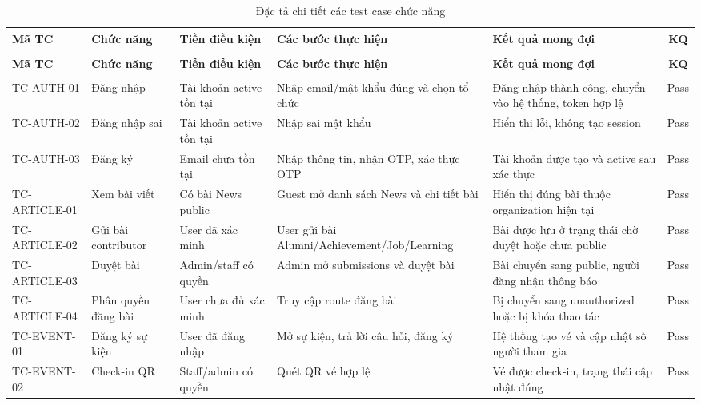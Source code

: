\documentclass[12pt,a4paper,oneside]{report}
\begin{document}
\renewcommand{\arraystretch}{1.25}
{\small
\begin{longtable}{|>{\raggedright\arraybackslash}p{2.3cm}|>{\raggedright\arraybackslash}p{2.1cm}|>{\raggedright\arraybackslash}p{2.6cm}|>{\raggedright\arraybackslash}p{3.4cm}|>{\raggedright\arraybackslash}p{3.6cm}|c|}
\caption{Đặc tả chi tiết các test case chức năng}\label{tab:appendixB}\\
\hline \textbf{Mã TC} & \textbf{Chức năng} & \textbf{Tiền điều kiện} & \textbf{Các bước thực hiện} & \textbf{Kết quả mong đợi} & \textbf{KQ} \\ \hline
\endfirsthead
\multicolumn{6}{l}{\itshape\small Bảng B.1 (tiếp theo)}\\[2pt]
\hline \textbf{Mã TC} & \textbf{Chức năng} & \textbf{Tiền điều kiện} & \textbf{Các bước thực hiện} & \textbf{Kết quả mong đợi} & \textbf{KQ} \\ \hline
\endhead
\hline \multicolumn{6}{r}{\itshape\small (còn tiếp)}\\
\endfoot
\hline
\endlastfoot
TC-AUTH-01 & Đăng nhập & Tài khoản active tồn tại & Nhập email/mật khẩu đúng và chọn tổ chức & Đăng nhập thành công, chuyển vào hệ thống, token hợp lệ & Pass \\ \hline
TC-AUTH-02 & Đăng nhập sai & Tài khoản active tồn tại & Nhập sai mật khẩu & Hiển thị lỗi, không tạo session & Pass \\ \hline
TC-AUTH-03 & Đăng ký & Email chưa tồn tại & Nhập thông tin, nhận OTP, xác thực OTP & Tài khoản được tạo và active sau xác thực & Pass \\ \hline
TC-ARTICLE-01 & Xem bài viết & Có bài News public & Guest mở danh sách News và chi tiết bài & Hiển thị đúng bài thuộc organization hiện tại & Pass \\ \hline
TC-ARTICLE-02 & Gửi bài contributor & User đã xác minh & User gửi bài Alumni/Achievement/Job/Learning & Bài được lưu ở trạng thái chờ duyệt hoặc chưa public & Pass \\ \hline
TC-ARTICLE-03 & Duyệt bài & Admin/staff có quyền & Admin mở submissions và duyệt bài & Bài chuyển sang public, người đăng nhận thông báo & Pass \\ \hline
TC-ARTICLE-04 & Phân quyền đăng bài & User chưa đủ xác minh & Truy cập route đăng bài & Bị chuyển sang unauthorized hoặc bị khóa thao tác & Pass \\ \hline
TC-EVENT-01 & Đăng ký sự kiện & User đã đăng nhập & Mở sự kiện, trả lời câu hỏi, đăng ký & Hệ thống tạo vé và cập nhật số người tham gia & Pass \\ \hline
TC-EVENT-02 & Check-in QR & Staff/admin có quyền & Quét QR vé hợp lệ & Vé được check-in, trạng thái cập nhật đúng & Pass \\ \hline

\end{longtable}}
\end{document}
